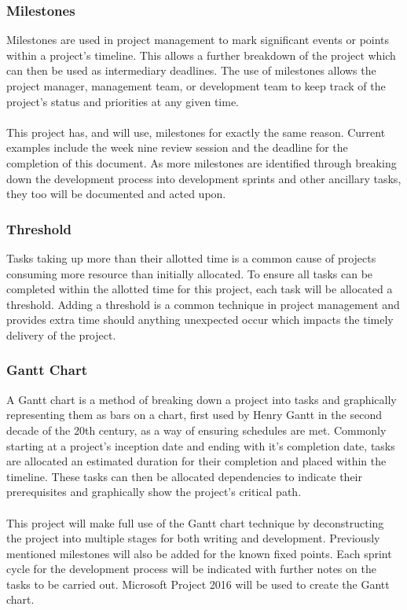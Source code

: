	\subsubsection{Milestones}
		Milestones are used in project management to mark significant events or points within a project’s timeline. This allows a further breakdown of the project which can then be used as intermediary deadlines. The use of milestones allows the project manager, management team, or development team to keep track of the project’s status and priorities at any given time.
		\\\\
		This project has, and will use, milestones for exactly the same reason. Current examples include the week nine review session and the deadline for the completion of this document. As more milestones are identified through breaking down the development process into development sprints and other ancillary tasks, they too will be documented and acted upon.
	\subsubsection{Threshold}
		Tasks taking up more than their allotted time is a common cause of projects consuming more resource than initially allocated. To ensure all tasks can be completed within the allotted time for this project, each task will be allocated a threshold. Adding a threshold is a common technique in project management and provides extra time should anything unexpected occur which impacts the timely delivery of the project.
	\subsubsection{Gantt Chart}\label{sec:methodology_gantt}
		A Gantt chart is a method of breaking down a project into tasks and graphically representing them as bars on a chart, first used by Henry Gantt in the second decade of the 20th century, as a way of ensuring schedules are met. Commonly starting at a project’s inception date and ending with it’s completion date, tasks are allocated an estimated duration for their completion and placed within the timeline. These tasks can then be allocated dependencies to indicate their prerequisites and graphically show the project’s critical path.
		\\\\
		This project will make full use of the Gantt chart technique by deconstructing the project into multiple stages for both writing and development. Previously mentioned milestones will also be added for the known fixed points. Each sprint cycle for the development process will be indicated with further notes on the tasks to be carried out. Microsoft Project 2016 will be used to create the Gantt chart.
